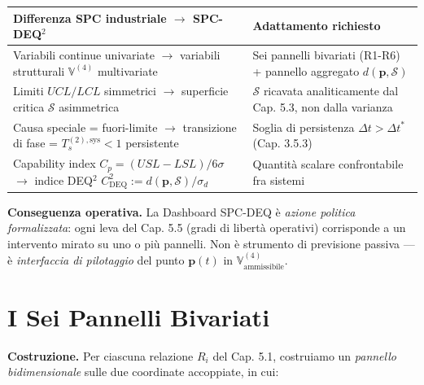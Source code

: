 {\def\LTcaptype{none} %
{\small\begin{longtable}[]{@{}
  >{\raggedright\arraybackslash}p{}
  >{\raggedright\arraybackslash}p{}@{}}
\toprule\noalign{}
\begin{minipage}[b]{\linewidth}\raggedright
Differenza SPC industriale $\to$ SPC-DEQ$^2$
\end{minipage} & \begin{minipage}[b]{\linewidth}\raggedright
Adattamento richiesto
\end{minipage} \\
\midrule\noalign{}
\endhead
\bottomrule\noalign{}
\endlastfoot
Variabili continue univariate $\to$ variabili strutturali
\(\mathbb{V}^{(4)}\) multivariate & Sei pannelli bivariati (R1-R6) +
pannello aggregato \(d(\boldsymbol{p}, \mathcal{S})\) \\
Limiti \(UCL/LCL\) simmetrici $\to$ superficie critica \(\mathcal{S}\)
asimmetrica & \(\mathcal{S}\) ricavata analiticamente dal Cap. 5.3, non
dalla varianza \\
Causa speciale = fuori-limite $\to$ transizione di fase =
\(T_s^{(2),\text{sys}} < 1\) persistente & Soglia di persistenza
\(\Delta t > \Delta t^*\) (Cap. 3.5.3) \\
Capability index \(C_p = (USL-LSL)/6\sigma\) $\to$ indice DEQ$^2$
\(C_{\text{DEQ}}^2 := d(\boldsymbol{p}, \mathcal{S}) / \sigma_d\) &
Quantità scalare confrontabile fra sistemi \\
\end{longtable}}
}

\Proved{} \textbf{Conseguenza operativa.} La Dashboard SPC-DEQ è
\emph{azione politica formalizzata}: ogni leva del Cap. 5.5 (gradi di
libertà operativi) corrisponde a un intervento mirato su uno o più
pannelli. Non è strumento di previsione passiva --- è \emph{interfaccia
di pilotaggio} del punto \(\boldsymbol{p}(t)\) in
\(\mathbb{V}^{(4)}_{\text{ammissibile}}\).



\section{I Sei Pannelli Bivariati}\label{i-sei-pannelli-bivariati}

\Hypoth{} \textbf{Costruzione.} Per ciascuna relazione \(R_i\) del Cap.
5.1, costruiamo un \emph{pannello bidimensionale} sulle due coordinate
accoppiate, in cui:

